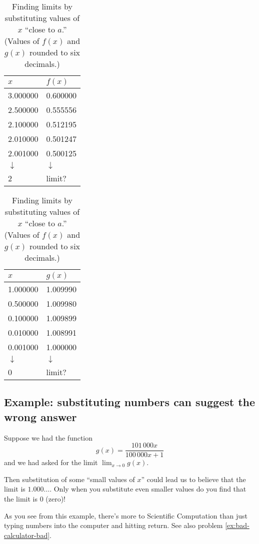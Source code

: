 \begin{table}[ht]
  \centering
  \begin{tabular}{ll}
    \toprule
    \quad$x$ & \quad$f(x)$ \\
    \midrule
    3.000000 & 0.600000\\
    2.500000 & 0.555556\\
    2.100000 & 0.512195\\
    2.010000 & 0.501247\\
    2.001000 & 0.500125\\
    $\downarrow$& \hfil$\downarrow$\hfil\\
    2 & \hfil limit?\hfil\\
    \bottomrule
  \end{tabular}
  \qquad\qquad
  \begin{tabular}{ll}
    \toprule
    \quad$x$ & \quad$g(x)$ \\
    \midrule
    1.000000 & 1.009990\\
    0.500000 & 1.009980\\
    0.100000 & 1.009899\\
    0.010000 & 1.008991\\
    0.001000 & 1.000000\\
    $\downarrow$& \hfil$\downarrow$\hfil\\
    0& \hfil limit?\hfil\\
    \bottomrule
  \end{tabular}
  \smallskip
  
  \caption{Finding limits by substituting values of $x$ ``close to $a$.''
    (Values of $f(x)$ and $g(x)$ rounded to six decimals.)}
  \label{tbl:finding-limits}
\end{table}  

\subsection{Example: substituting numbers can suggest the wrong answer}
\label{ex:limit-by-sub-bad}
Suppose we had the function
\[
g(x) = \frac{101\,000x}{100\,000x+1}
\]
and we had asked for the limit $\lim_{x\to0}g(x)$.

Then substitution of some ``small values of $x$'' could lead us to believe
that the limit is $1.000\ldots$.  Only when you substitute even smaller
values do you find that the limit is $0$ (zero)!

As you see from this example, there's more to Scientific Computation
than just typing numbers into the computer and hitting return.  See
also problem \ref{ex:bad-calculator-bad}.


